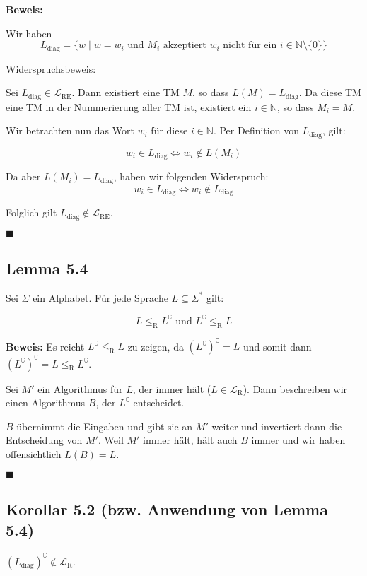 \documentclass[a4paper, 11pt]{article}
\def\N{\mathbb{N}}
\def\L{\mathcal{L}}
\begin{document}
    \textbf{Beweis:}

    Wir haben 
    $$L_{\text{diag}} = \{w \mid w = w_i \text{ und $M_i$ akzeptiert $w_i$ nicht für ein $i \in \N\setminus\{0\}$}\}$$

    Widerspruchsbeweis:

    Sei $L_\text{diag} \in \L_{\text{RE}}$. Dann existiert eine TM $M$, so dass $L(M) = L_\text{diag}$. Da diese TM eine TM in der Nummerierung aller TM ist, existiert ein $i \in \N$, so dass $M_i = M$.

    Wir betrachten nun das Wort $w_i$ für diese $i \in \N$. Per Definition von $L_\text{diag}$, gilt:

    $$w_i \in L_\text{diag} \iff w_i \notin L(M_i)$$

    Da aber $L(M_i) = L_\text{diag}$, haben wir folgenden Widerspruch:
    $$w_i \in L_\text{diag} \iff w_i \notin L_\text{diag}$$

    Folglich gilt $L_\text{diag} \notin \L_\text{RE}$.

    \hspace*{0pt}\hfill$\blacksquare$

    \subsection*{Lemma 5.4}
    Sei $\Sigma$ ein Alphabet. Für jede Sprache $L \subseteq \Sigma^*$ gilt:
    
    $$L \leq_\text{R} L^\complement \text{ und } L^\complement \leq_\text{R} L$$

    \textbf{Beweis: }
    Es reicht $L^\complement \leq_\text{R} L$ zu zeigen, da $(L^\complement)^\complement = L$ und somit dann $(L^\complement)^\complement = L \leq_\text{R} L^\complement$.

    Sei $M'$ ein Algorithmus für $L$, der immer hält ($L \in \L_\text{R}$). Dann beschreiben wir einen Algorithmus $B$, der $L^\complement$ entscheidet. 
    
    $B$ übernimmt die Eingaben und gibt sie an $M'$ weiter und invertiert dann die Entscheidung von $M'$. Weil $M'$ immer hält, hält auch $B$ immer und wir haben offensichtlich $L(B) = L$.

    \hspace*{0pt}\hfill$\blacksquare$

    \subsection*{Korollar 5.2 (bzw. Anwendung von Lemma 5.4)}
    $(L_\text{diag})^\complement \notin \L_\text{R}$.
    
\end{document}
